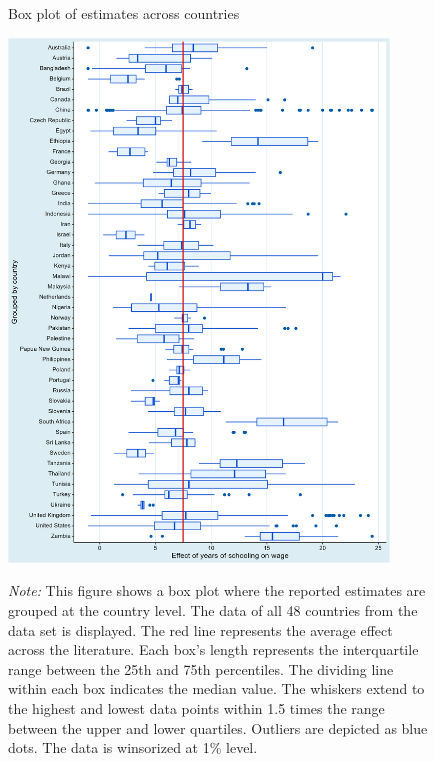 \begin{figure}[!htbp]
\begin{center}
\caption{Box plot of estimates across countries}
\label{fig:box_plot_countries}
\includegraphics[width=0.9\textwidth]{Figures/box_plot_country.png}
\end{center}\vspace{-0.7cm}
\captionsetup{width=0.9\textwidth, font = scriptsize}
\caption*{\emph{Note:} This figure shows a box plot where the reported estimates are grouped at the country level. The data of all 48 countries from the data set is displayed. The red line represents the average effect across the literature. Each box's length represents the interquartile range between the 25th and 75th percentiles. The dividing line within each box indicates the median value. The whiskers extend to the highest and lowest data points within 1.5 times the range between the upper and lower quartiles. Outliers are depicted as blue dots. The data is winsorized at 1\% level.}
\end{figure}
